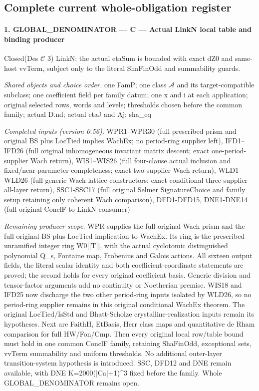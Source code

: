 \documentclass[11pt,a4paper]{article}
\numberwithin{equation}{section}
\theoremstyle{remark}\newtheorem{remark}[theorem]{Remark}
\begin{document}
\subsection{Complete current whole-obligation register}
\paragraph{1. GLOBAL\_\allowbreak DENOMINATOR — C — Actual LinkN local table and binding producer}

Closed(Des $\mathcal C$ 3) LinkN: the actual etaSum is bounded with exact dZ0 and same-host vvTerm, subject only to the literal ShaFinOdd and summability guards.

\emph{Shared objects and choice order.} one FamP; one class $\mathcal A$ and its target-compatible subclass; one coefficient field per family datum; one x and i at each application; original selected rows, words and levels; thresholds chosen before the common family; actual D.nd; actual etaJ and Aj; sha\_\allowbreak eq

\emph{Completed inputs (version 0.56).} WPR1–WPR30 (full prescribed prism and original BS plus LocTied implies WachEx; no period-ring supplier left), IFD1–IFD26 (full original inhomogeneous invariant matrix descent; exact one-period-supplier Wach return), WIS1–WIS26 (full four-clause actual inclusion and fixed/near-parameter completeness; exact two-supplier Wach return), WLD1-WLD26 (full generic Wach lattice constructors; exact conditional three-supplier all-layer return), SSC1-SSC17 (full original Selmer SignatureChoice and family setup retaining only coherent Wach comparison), DFD1-DFD15, DNE1-DNE14 (full original ConclF-to-LinkN consumer)

\emph{Remaining producer scope.} WPR supplies the full original Wach prism and the full original BS plus LocTied implication to WachEx. Its ring is the prescribed unramified integer ring W0[[T]], with the actual cyclotomic distinguished polynomial Q\_\allowbreak s, Fontaine map, Frobenius and Galois actions. All sixteen output fields, the literal scalar identity and both coefficient-coordinate statements are proved; the second holds for every original coefficient basis. Generic division and tensor-factor arguments add no continuity or Noetherian premise. WIS18 and IFD25 now discharge the two other period-ring inputs isolated by WLD26, so no period-ring supplier remains in this original conditional WachEx theorem. The original LocTied/IsStd and Bhatt-Scholze crystalline-realization inputs remain its hypotheses. Next are FaithH, EtBasis, Herr class maps and quantitative de Rham comparison for full HW/Fon/Cmp. Then every original local row/table bound must hold in one common ConclF family, retaining ShaFinOdd, exceptional sets, vvTerm summability and uniform thresholds. No additional outer-layer transition-system hypothesis is introduced. SSC, DFD12 and DNE remain available, with DNE K=2000(|Ca|+1)\textasciicircum{}3 fixed before the family. Whole GLOBAL\_\allowbreak DENOMINATOR remains open.
\end{document}
